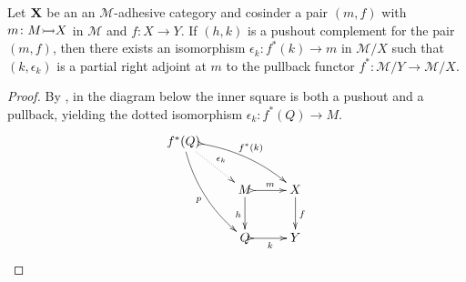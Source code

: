 \begin{lemma}\label{lem:part}
	Let $\textbf {\textup{X}}$ be an  an $\mathcal{M}$-adhesive category  and cosinder a pair $(m,f)$ with $m\colon M\mto X $ in $\mathcal{M}$ and $f:X\to Y$. If $(h, k)$ is a pushout complement for the pair $(m,f)$, then there exists an isomorphism $\epsilon_k:f^*(k)\to m$ in $\mathcal{M}/X$ such that $(k, \epsilon_k)$ is  a partial right adjoint at $m$ to the pullback functor $f^*\colon \mathcal{M}/Y\to \mathcal{M}/X$.
\end{lemma}
\begin{proof}
	By , in the diagram below the inner square is both  a pushout and a pullback, yielding the dotted isomorphism $\epsilon_k\colon f^*(Q)\to M$.
\[\xymatrix{f^*(Q) \ar@{.>}[dr]^{\epsilon_k} \ar@{>->}@/^.3cm/[drr]^{f^*(k)} \ar@/_.3cm/[ddr]_{p}\\& M \ar@{>->}[r]^{m}\ar[d]_{h}& X \ar[d]^f \\&Q\ar@{>->}[r]_{k}&Y}\]


\end{proof}
